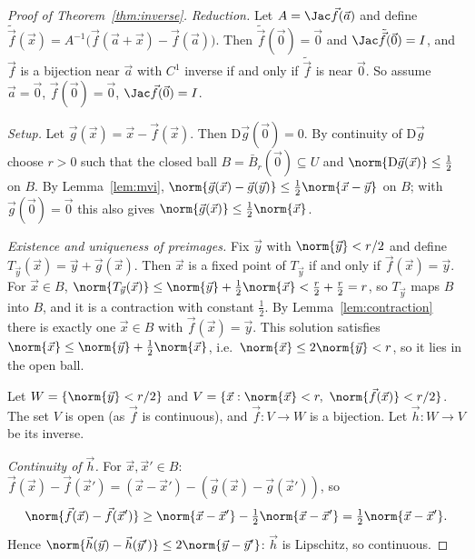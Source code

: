 \begin{proof}[Proof of Theorem~\ref{thm:inverse}]
\emph{Reduction.} Let $A=\Jac\vec f(\vec a)$ and define $\tilde{\vec f}(\vec x)=A^{-1}\bigl(\vec f(\vec a+\vec x)-\vec f(\vec a)\bigr)$. Then $\tilde{\vec f}(\vec 0)=\vec 0$ and $\Jac\tilde{\vec f}(\vec 0)=I$, and $\vec f$ is a bijection near $\vec a$ with $C^1$ inverse if and only if $\tilde{\vec f}$ is near $\vec 0$. So assume $\vec a=\vec0$, $\vec f(\vec 0)=\vec0$, $\Jac\vec f(\vec 0)=I$.

\emph{Setup.} Let $\vec g(\vec x)=\vec x-\vec f(\vec x)$. Then $\mathrm{D}\vec g(\vec 0)=0$. By continuity of $\mathrm{D}\vec g$ choose $r>0$ such that the closed ball $B=\bar B_r(\vec 0)\subseteq U$ and $\norm{\mathrm{D}\vec g(\vec x)}\le\tfrac12$ on $B$. By Lemma~\ref{lem:mvi}, $\norm{\vec g(\vec x)-\vec g(\vec y)}\le\tfrac12\norm{\vec x-\vec y}$ on $B$; with $\vec g(\vec 0)=\vec 0$ this also gives $\norm{\vec g(\vec x)}\le\frac12\norm{\vec x}$.

\emph{Existence and uniqueness of preimages.} Fix $\vec y$ with $\norm{\vec y}<r/2$ and define $T_{\vec y}(\vec x)=\vec y+\vec g(\vec x)$. Then $\vec x$ is a fixed point of $T_{\vec y}$ if and only if $\vec f(\vec x)=\vec y$. For $\vec x\in B$, $\norm{T_{\vec y}(\vec x)}\le\norm{\vec y}+\tfrac12\norm{\vec x}<\tfrac r2+\tfrac r2=r$, so $T_{\vec y}$ maps $B$ into $B$, and it is a contraction with constant $\tfrac12$. By Lemma~\ref{lem:contraction} there is exactly one $\vec x\in B$ with $\vec f(\vec x)=\vec y$. This solution satisfies $\norm{\vec x}\le\norm{\vec y}+\tfrac12\norm{\vec x}$, i.e.\ $\norm{\vec x}\le2\norm{\vec y}<r$, so it lies in the open ball.

Let $W=\{\norm{\vec y}<r/2\}$ and $V=\{\vec x:\norm{\vec x}<r,\ \norm{\vec f(\vec x)}<r/2\}$. The set $V$ is open (as $\vec f$ is continuous), and $\vec f:V\to W$ is a bijection. Let $\vec h:W\to V$ be its inverse.

\emph{Continuity of $\vec h$.} For $\vec x,\vec x'\in B$: $\vec f(\vec x)-\vec f(\vec x')=(\vec x-\vec x')-(\vec g(\vec x)-\vec g(\vec x'))$, so
\[
\norm{\vec f(\vec x)-\vec f(\vec x')}\ge\norm{\vec x-\vec x'}-\tfrac12\norm{\vec x-\vec x'}=\tfrac12\norm{\vec x-\vec x'} .
\]
Hence $\norm{\vec h(\vec y)-\vec h(\vec y')}\le2\norm{\vec y-\vec y'}$: $\vec h$ is Lipschitz, so continuous.


\end{proof}
